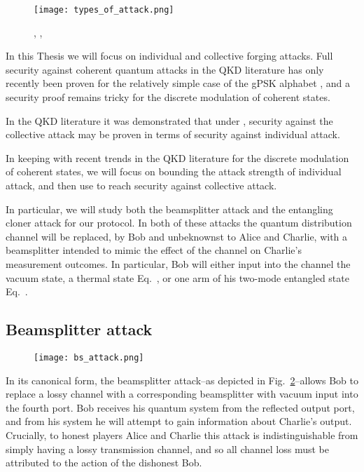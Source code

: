 \begin{figure}[htp]
\centering
\texttt{[image: types\_of\_attack.png]}
\caption{\label{fig:individual_attacks}, \label{fig:collective_attacks},\label{fig:coherent_attacks}}
\end{figure}

In this Thesis we will focus on individual and collective forging attacks. Full security against coherent quantum attacks in the QKD literature has only recently been proven for the relatively simple case of the gPSK alphabet , and a security proof remains tricky for the discrete modulation of coherent states. %

In the QKD literature it was demonstrated  that under , security against the collective attack may be proven in terms of security against individual attack. 

In keeping with recent trends in the QKD literature for the discrete modulation of coherent states, we will focus on bounding the attack strength of individual attack, and then use  to reach security against collective attack. 


In particular, we will study both the beamsplitter attack and the entangling cloner attack for our protocol. In both of these attacks the quantum distribution channel will be replaced, by Bob and unbeknownst to Alice and Charlie, with a beamsplitter intended to mimic the effect of the channel on Charlie's measurement outcomes. In particular, Bob will either input into the channel the vacuum state, a thermal state Eq.~, or one arm of his two-mode entangled state Eq.~.

\subsection{Beamsplitter attack}

\begin{figure}[htp]
\centering
\texttt{[image: bs\_attack.png]}
\caption{\label{fig:bs0_attack}}
\end{figure}
In its canonical form, the beamsplitter attack--as depicted in Fig.~\ref{fig:bs0_attack}--allows Bob to replace a lossy channel with a corresponding beamsplitter with vacuum input into the fourth port. Bob receives his quantum system from the reflected output port, and from his system he will attempt to gain information about Charlie's output. Crucially, to honest players Alice and Charlie this attack is indistinguishable from simply having a lossy transmission channel, and so all channel loss must be attributed to the action of the dishonest Bob. 

